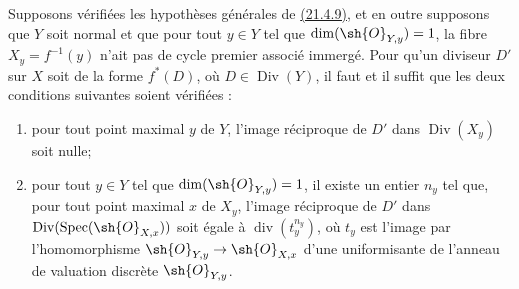 \begin{corollary}[21.4.10]
Supposons vérifiées les hypothèses générales de
{\hyperlink{ega4.c04.prop.21-4-9}{(21.4.9)}}, et en outre supposons que
$Y$ soit normal et que pour tout $y\in Y$ tel que
$\dim(\sh{O}_{Y,y})=1$, la fibre $X_y=f^{-1}(y)$ n'ait pas de cycle
premier associé immergé. Pour qu'un diviseur $D'$ sur $X$ soit de la
forme $f^*(D)$, où $D\in\operatorname{Div}(Y)$, il faut et il suffit
que les deux conditions suivantes soient vérifiées :
\begin{enumerate}[label=\textup{\arabic*\textdegree}]
\item pour tout point maximal $y$ de $Y$, l'image réciproque de $D'$
dans $\operatorname{Div}(X_y)$ soit nulle;
\item pour tout $y\in Y$ tel que $\dim(\sh{O}_{Y,y})=1$, il existe un
entier $n_y$ tel que, pour tout point maximal $x$ de $X_y$, l'image
réciproque de $D'$ dans
$\operatorname{Div}(\operatorname{Spec}(\sh{O}_{X,x}))$ soit égale à
$\operatorname{div}(t_y^{n_y})$, où $t_y$ est l'image par
l'homomorphisme $\sh{O}_{Y,y}\to\sh{O}_{X,x}$ d'une uniformisante de
l'anneau de valuation discrète $\sh{O}_{Y,y}$.
\end{enumerate}
\end{corollary}

